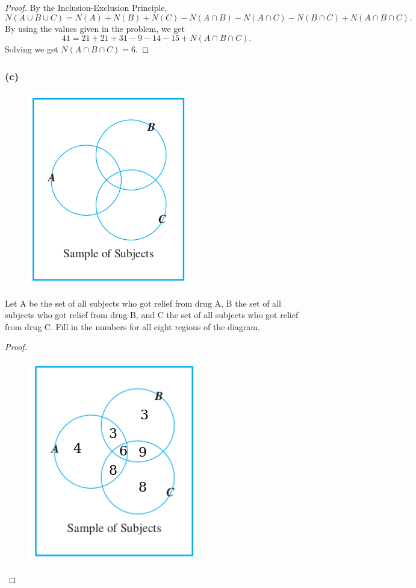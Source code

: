 \documentclass[14pt]{extarticle}
\begin{document}
\begin{proof}
By the Inclusion-Exclusion Principle,
\[
N(A \cup B \cup C) = N(A) + N(B) + N(C) - N(A \cap B) - N(A \cap C) - N(B \cap C) + N(A \cap B \cap C).
\]
By using the values given in the problem, we get
\[
41 = 21 + 21 + 31 - 9 - 14 - 15 + N(A \cap B \cap C).
\]
Solving we get \(N(A \cap B \cap C) = 6\).
\end{proof}

\subsubsection{(c)}
\begin{figure}[ht!]
\centering
\includegraphics[scale=0.4]{../images/9.3.34.c.1.png}
\end{figure}

Let A be the set of all subjects who got relief from drug A, B the set of all subjects who got relief from drug B, 
and C the set of all subjects who got relief from drug C. Fill in the numbers for all eight regions of the diagram.

\begin{proof}
\begin{figure}[ht!]
\centering
\includegraphics[scale=0.4]{../images/9.3.34.c.2.png}
\end{figure}
\end{proof}
\end{document}
